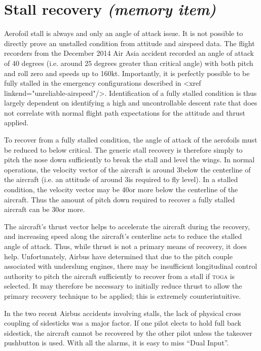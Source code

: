 \documentclass[a5paper,11pt,twoside]{book}
\newcommand{\ac}[1]{{\scshape\MakeLowercase{#1}}}
\newcommand{\inlcite}[1]{{\ac{#1}}}
\newcommand{\multicite}[1]{%
  \nopagebreak
  \noindent{{\color{blue}\footnotesize[\inlcite{#1}]}}
}
\begin{document}
\multicite{QRH~AER.80, FCOM~PRO.AER.MISC}

\section{Stall recovery \emph{(memory item)}}

Aerofoil stall is always and only an angle of attack issue. It is not possible
to directly prove an unstalled condition from attitude and airspeed data. The
flight recorders from the December 2014 Air Asia accident recorded an angle of
attack of 40 degrees (i.e. around 25 degrees greater than critical angle) with
both pitch and roll zero and speeds up to 160kt. Importantly, it is perfectly
possible to be fully stalled in the emergency configurations described in <xref
linkend="unreliable-airspeed"/>. Identification of a fully stalled condition is
thus largely dependent on identifying a high and uncontrollable descent rate
that does not correlate with normal flight path expectations for the attitude
and thrust applied.

To recover from a fully stalled condition, the angle of attack of the aerofoils
must be reduced to below critical. The generic stall recovery is therefore
simply to pitch the nose down sufficiently to break the stall and level the
wings. In normal operations, the velocity vector of the aircraft is around
3\textdegree{ }below the centerline of the aircraft (i.e. an attitude of around
3\textdegree{ }is required to fly level). In a stalled condition, the velocity
vector may be 40\textdegree{ }or more below the centerline of the
aircraft. Thus the amount of pitch down required to recover a fully stalled
aircraft can be 30\textdegree{ }or more.

The aircraft's thrust vector helps to accelerate the aircraft during the
recovery, and increasing speed along the aircraft's centerline acts to reduce
the stalled angle of attack. Thus, while thrust is not a primary means of
recovery, it does help. Unfortunately, Airbus have determined that due to the
pitch couple associated with underslung engines, there may be insufficient
longitudinal control authority to pitch the aircraft sufficiently to recover
from a stall if \ac{TOGA} is selected. It may therefore be necessary to
initially reduce thrust to allow the primary recovery technique to be applied;
this is extremely counterintuitive.

In the two recent Airbus accidents involving stalls, the lack of physical cross
coupling of sidesticks was a major factor. If one pilot elects to hold full back
sidestick, the aircraft cannot be recovered by the other pilot unless the
takeover pushbutton is used. With all the alarms, it is easy to miss ``Dual
Input''.
\end{document}
